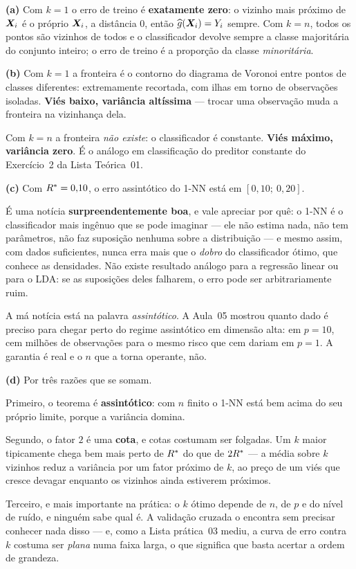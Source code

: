 \documentclass[11pt,a4paper]{article}
\begin{document}
\begin{solucao}
\textbf{(a)} Com $k=1$ o erro de treino é \textbf{exatamente zero}: o vizinho
mais próximo de $\bm{X}_i$ é o próprio $\bm{X}_i$, a distância $0$, então
$\widehat{g}(\bm{X}_i)=Y_i$ sempre. Com $k=n$, todos os pontos são vizinhos de todos e o
classificador devolve sempre a classe majoritária do conjunto inteiro; o erro de
treino é a proporção da classe \emph{minoritária}.

\smallskip
\textbf{(b)} Com $k=1$ a fronteira é o contorno do diagrama de Voronoi entre
pontos de classes diferentes: extremamente recortada, com ilhas em torno de
observações isoladas. \textbf{Viés baixo, variância altíssima} --- trocar uma
observação muda a fronteira na vizinhança dela.

Com $k=n$ a fronteira \emph{não existe}: o classificador é constante. \textbf{Viés
máximo, variância zero}. É o análogo em classificação do preditor constante do
Exercício~2 da Lista Teórica~01.

\smallskip
\textbf{(c)} Com $R^\ast = 0{,}10$, o erro assintótico do 1-NN está em
$[0{,}10;\ 0{,}20]$.

É uma notícia \textbf{surpreendentemente boa}, e vale apreciar por quê: o 1-NN é
o classificador mais ingênuo que se pode imaginar --- ele não estima nada, não
tem parâmetros, não faz suposição nenhuma sobre a distribuição --- e mesmo assim,
com dados suficientes, nunca erra mais que o \emph{dobro} do classificador ótimo,
que conhece as densidades. Não existe resultado análogo para a regressão linear
ou para o LDA: se as suposições deles falharem, o erro pode ser arbitrariamente
ruim.

A má notícia está na palavra \emph{assintótico}. A Aula~05 mostrou quanto dado é
preciso para chegar perto do regime assintótico em dimensão alta: em $p=10$,
cem milhões de observações para o mesmo risco que cem dariam em $p=1$. A garantia
é real e o $n$ que a torna operante, não.

\smallskip
\textbf{(d)} Por três razões que se somam.

Primeiro, o teorema é \textbf{assintótico}: com $n$ finito o 1-NN está bem acima
do seu próprio limite, porque a variância domina.

Segundo, o fator $2$ é uma \textbf{cota}, e cotas costumam ser folgadas. Um $k$
maior tipicamente chega bem mais perto de $R^\ast$ do que de $2R^\ast$
--- a média sobre $k$ vizinhos reduz a variância por um fator próximo de $k$, ao
preço de um viés que cresce devagar enquanto os vizinhos ainda estiverem próximos.

Terceiro, e mais importante na prática: o $k$ ótimo depende de $n$, de $p$ e do
nível de ruído, e ninguém sabe qual é. A validação cruzada o encontra sem precisar
conhecer nada disso --- e, como a Lista prática~03 mediu, a curva de erro contra
$k$ costuma ser \emph{plana} numa faixa larga, o que significa que basta acertar
a ordem de grandeza.
\end{solucao}
\end{document}

